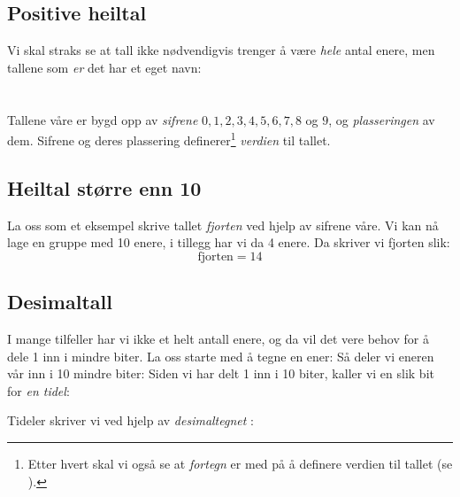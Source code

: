 \subsection*{Positive heiltal}
Vi skal straks se at tall ikke nødvendigvis trenger å være \textsl{hele} antal enere, men tallene som \textsl{er} det har et eget navn:\regv


\newpage
\section{\talsifverd}
Tallene våre er bygd opp av \textit{sifrene} $ 0, 1, 2 , 3, 4, 5, 6, 7, 8 $ og $ 9 $, og \textsl{plasseringen} av dem. Sifrene og deres plassering definerer\footnote{Etter hvert skal vi også se at \textit{fortegn} er med på å definere verdien til tallet (se ).} \textit{verdien}  til tallet.
\subsection*{Heiltal større enn 10}
La oss som et eksempel skrive tallet \textsl{fjorten} ved hjelp av sifrene våre.
Vi kan nå lage en gruppe med 10 enere, i tillegg har vi da 4 enere. Da skriver vi fjorten slik:
\[ \text{fjorten}=14 \]
\vsk

\newpage
\subsection*{Desimaltall}
I mange tilfeller har vi ikke et helt antall enere, og da vil det vere behov for å dele 1 inn i mindre biter. La oss starte med å tegne en ener:
Så deler vi eneren vår inn i 10 mindre biter:
Siden vi har delt 1 inn i 10 biter, kaller vi en slik bit for \textit{en tidel}:
\begin{comment}
\eks{\vs
	\fig{maal2}
	\fig{des2}
}\vsk
\end{comment}
Tideler skriver vi ved hjelp av  \textit{desimaltegnet} \sym{,}  :
\regv
{}
\newpage
